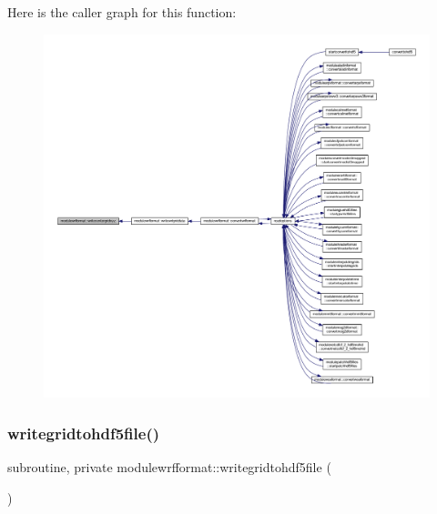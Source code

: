 Here is the caller graph for this function\+:\nopagebreak
\begin{figure}[H]
\begin{center}
\leavevmode
\includegraphics[width=350pt]{namespacemodulewrfformat_a731fdf35a2c828689a5ab27bc57be092_icgraph}
\end{center}
\end{figure}
\mbox{\label{namespacemodulewrfformat_a05d05aad9544d129c314b6f52333b039}} 
\subsubsection{\texorpdfstring{writegridtohdf5file()}{writegridtohdf5file()}}
{\footnotesize\ttfamily subroutine, private modulewrfformat\+::writegridtohdf5file (\begin{DoxyParamCaption}{ }\end{DoxyParamCaption})\hspace{0.3cm}{\ttfamily [private]}}

